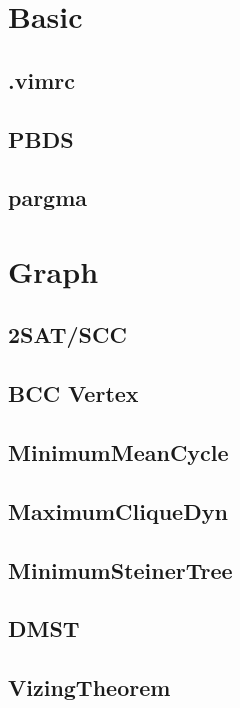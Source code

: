 \section{Basic}
	\subsection{.vimrc}
	
	\subsection{PBDS}
	
	\subsection{pargma}
	
\section{Graph}
	\subsection{2SAT/SCC}
	
	\subsection{BCC Vertex}
	
	\subsection{MinimumMeanCycle}
	
	\subsection{MaximumCliqueDyn}
	
	\subsection{MinimumSteinerTree}
	
	\subsection{DMST}
	
	\subsection{VizingTheorem}
	

